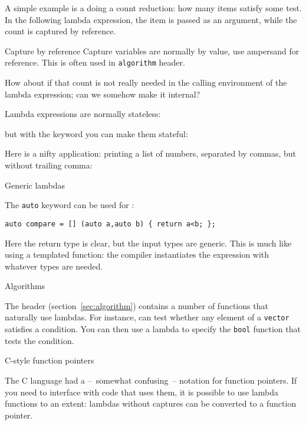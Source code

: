 A simple example is a doing a count reduction:
how many items satisfy some test.
In the following lambda expression, the item
is passed as an argument,
while the count is captured by reference.


\begin{slide}{Capture by reference}
  \label{sl:lambda-count}
  Capture variables are normally by value,
  use ampersand for reference.
  This is often used in \lstinline{algorithm} header.
\end{slide}

How about if that count is not really needed
in the calling environment of the lambda expression;
can we somehow make it internal?

Lambda expressions are normally stateless:


but with the  keyword you can
make them stateful:


Here is a nifty application: printing a list of numbers,
separated by commas, but without trailing comma:
%

 {Generic lambdas}
\label{sec:lambda-generic}

The \lstinline{auto} keyword can be used for
:
\begin{lstlisting}
auto compare = [] (auto a,auto b) { return a<b; };
\end{lstlisting}
Here the return type is clear, but the input types are generic.
This is much like using a templated function:
the compiler instantiates the expression with whatever types are needed.

 {Algorithms}

The  header (section~\ref{sec:algorithm})
contains a number of functions that
naturally use lambdas. For instance,  can test
whether any element of a \lstinline{vector} satisfies a condition.
You can then use a lambda to specify the \lstinline{bool} function
that tests the condition.

 {C-style function pointers}

The C language had a --~somewhat confusing~-- notation
for function pointers.
If you need to interface with code that uses them,
it is possible to use lambda functions to an extent:
lambdas without captures can be converted to a function pointer.

